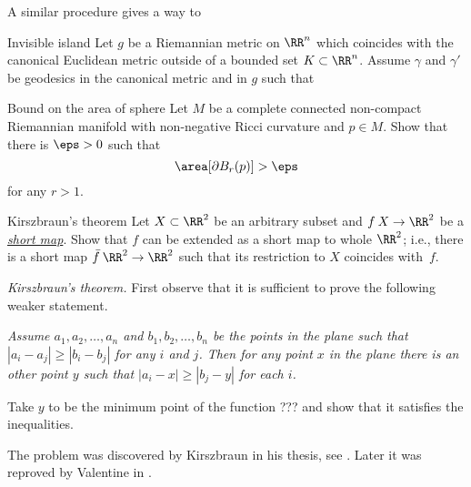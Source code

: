 A similar procedure gives a way to 










\begin{pr}{}{Invisible island}
Let $g$ be a Riemannian metric on $\RR^n$ which coincides with the canonical Euclidean metric outside of a bounded set $K\subset \RR^n$.
Assume $\gamma$ and $\gamma'$ be geodesics in the canonical metric and in $g$
such that
\end{pr}





\begin{pr}{}{Bound on the area of sphere}
Let $M$ be a complete connected non-compact Riemannian manifold with non-negative Ricci curvature and $p\in M$.
Show that there is $\eps>0$ such that
$$\area [\partial B_r(p)]>\eps$$
for any $r>1$.
\end{pr}










\begin{pr}{}{Kirszbraun's theorem}\label{kirszbrun}
Let $X\subset\RR^2$ be an arbitrary subset and $f\:X\to\RR^2$ be a \hyperref[Short map]{\emph{short map}}.
Show that $f$ can be extended as a short map to whole $\RR^2$;
i.e., there is a short map $\bar f\:\RR^2\to\RR^2$ such that its restriction to $X$ coincides with~$f$.
\end{pr}
\textit{Kirszbraun's theorem.}
First observe that it is sufficient to prove the following weaker statement.

\textit{Assume $a_1,a_2,\dots,a_n$ and $b_1,b_2,\dots, b_n$ be the points in the plane such that 
$|a_i-a_j|\ge |b_i-b_j|$
for any $i$ and $j$.
Then for any point $x$ in the plane there is an other point $y$ such that
$|a_i-x|\ge |b_j-y|$
for each $i$.}

Take $y$ to be the minimum point  of the function ???
and show that it satisfies the inequalities.

The problem was discovered by Kirszbraun in his thesis, see \cite{kirszbraun}.
Later it was reproved by Valentine in \cite{valentine}.











